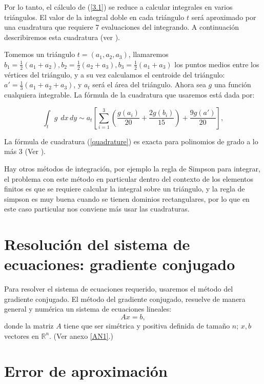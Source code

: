 \documentclass[12pt,spanish,oneside]{book}
\theoremstyle{plain}
\numberwithin{equation}{chapter}
\theoremstyle{definition}
\theoremstyle{remark}
\newcommand{\re}{\mathbb{R}}
\newcommand{\dxy}{\hspace{5pt} dx\hspace{2pt} dy }
\begin{document}
Por lo tanto, el cálculo de (\ref{3.1}) se reduce a calcular integrales en varios triángulos. El valor de la integral doble en cada triángulo $t$ será aproximado por una cuadratura que requiere 7 evaluaciones del integrando. A continuación describiremos esta cuadratura (ver \cite{Claes}).

Tomemos un triángulo $t=(a_1,a_2,a_3)$, llamaremos $b_1=\frac{1}{2}(a_1+a_2),b_2=\frac{1}{2}(a_2+a_3),b_3=\frac{1}{2}(a_1+a_3)$ los puntos medios entre los vértices del triángulo, y a su vez calculamos el centroide del triángulo: $ a'=\frac{1}{3}(a_1+a_2+a_3)$, y $a_t$ será el área del triángulo. Ahora sea $g$ una función cualquiera integrable. La fórmula de la cuadratura que usaremos está dada por: 

\begin{equation} 
\int_t g \dxy \sim a_t\left [ \sum_{i=1}^3\left( \frac{g(a_i)}{20} + \frac{ 2 g(b_i)}{15}\right) + \frac{9 g(a')}{20}\right ],
\label{quadrature}
\end{equation}

La fórmula de cuadratura (\ref{quadrature}) es exacta para polinomios de grado a lo más 3 (Ver \cite{Claes}). 

Hay otros métodos de integración, por ejemplo la regla de Simpson para integrar, el problema con este método en particular dentro del contexto de los elementos finitos es que se requiere calcular la integral sobre un triángulo, y la regla de simpson es muy buena cuando se tienen dominios rectangulares, por lo que en este caso particular nos conviene más usar las cuadraturas.



\section{Resolución del sistema de ecuaciones: gradiente conjugado}

Para resolver el sistema de ecuaciones requerido, usaremos el método del gradiente conjugado. El método del gradiente conjugado, resuelve de manera general y numérica un sistema de ecuaciones lineales:
\begin{equation}Ax=b,\label{axb1} \end{equation}
donde la matriz $A$ tiene que ser simétrica y positiva definida de tamaño $n$; $x,b$ vectores en $\re^n$. (Ver anexo \ref{AN1}.)
\section{Error de aproximación}
\end{document}
